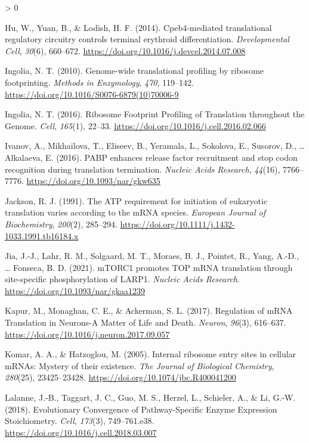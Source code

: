 \documentclass[
  12pt,
  openany]{book}
\newlength{\cslhangindent}
\newenvironment{CSLReferences}[2] %
 {%
  \setlength{\parindent}{0pt}
  \ifodd #1 \everypar{\setlength{\hangindent}{\cslhangindent}}\ignorespaces\fi
  \ifnum #2 > 0
  \setlength{\parskip}{#2\baselineskip}
  \fi
 }%
 {}
\begin{document}
\begin{CSLReferences}{1}{0}
\leavevmode\hypertarget{ref-Hu2014}{}%
Hu, W., Yuan, B., \& Lodish, H. F. (2014). Cpeb4-mediated translational regulatory circuitry controls terminal erythroid differentiation. \emph{Developmental Cell}, \emph{30}(6), 660--672. \url{https://doi.org/10.1016/j.devcel.2014.07.008}

\leavevmode\hypertarget{ref-Ingolia2010}{}%
Ingolia, N. T. (2010). Genome-wide translational profiling by ribosome footprinting. \emph{Methods in Enzymology}, \emph{470}, 119--142. \url{https://doi.org/10.1016/S0076-6879(10)70006-9}

\leavevmode\hypertarget{ref-Ingolia2016}{}%
Ingolia, N. T. (2016). Ribosome {Footprint Profiling} of {Translation} throughout the {Genome}. \emph{Cell}, \emph{165}(1), 22--33. \url{https://doi.org/10.1016/j.cell.2016.02.066}

\leavevmode\hypertarget{ref-Ivanov2016}{}%
Ivanov, A., Mikhailova, T., Eliseev, B., Yeramala, L., Sokolova, E., Susorov, D., \ldots{} Alkalaeva, E. (2016). {PABP} enhances release factor recruitment and stop codon recognition during translation termination. \emph{Nucleic Acids Research}, \emph{44}(16), 7766--7776. \url{https://doi.org/10.1093/nar/gkw635}

\leavevmode\hypertarget{ref-Jackson1991}{}%
Jackson, R. J. (1991). The {ATP} requirement for initiation of eukaryotic translation varies according to the {mRNA} species. \emph{European Journal of Biochemistry}, \emph{200}(2), 285--294. \url{https://doi.org/10.1111/j.1432-1033.1991.tb16184.x}

\leavevmode\hypertarget{ref-Jia2021}{}%
Jia, J.-J., Lahr, R. M., Solgaard, M. T., Moraes, B. J., Pointet, R., Yang, A.-D., \ldots{} Fonseca, B. D. (2021). {mTORC1} promotes {TOP mRNA} translation through site-specific phosphorylation of {LARP1}. \emph{Nucleic Acids Research}. \url{https://doi.org/10.1093/nar/gkaa1239}

\leavevmode\hypertarget{ref-Kapur2017}{}%
Kapur, M., Monaghan, C. E., \& Ackerman, S. L. (2017). Regulation of {mRNA Translation} in {Neurons}-{A Matter} of {Life} and {Death}. \emph{Neuron}, \emph{96}(3), 616--637. \url{https://doi.org/10.1016/j.neuron.2017.09.057}

\leavevmode\hypertarget{ref-Komar2005}{}%
Komar, A. A., \& Hatzoglou, M. (2005). Internal ribosome entry sites in cellular {mRNAs}: Mystery of their existence. \emph{The Journal of Biological Chemistry}, \emph{280}(25), 23425--23428. \url{https://doi.org/10.1074/jbc.R400041200}

\leavevmode\hypertarget{ref-Lalanne2018}{}%
Lalanne, J.-B., Taggart, J. C., Guo, M. S., Herzel, L., Schieler, A., \& Li, G.-W. (2018). Evolutionary {Convergence} of {Pathway}-{Specific Enzyme Expression Stoichiometry}. \emph{Cell}, \emph{173}(3), 749--761.e38. \url{https://doi.org/10.1016/j.cell.2018.03.007}


\end{CSLReferences}
\end{document}
